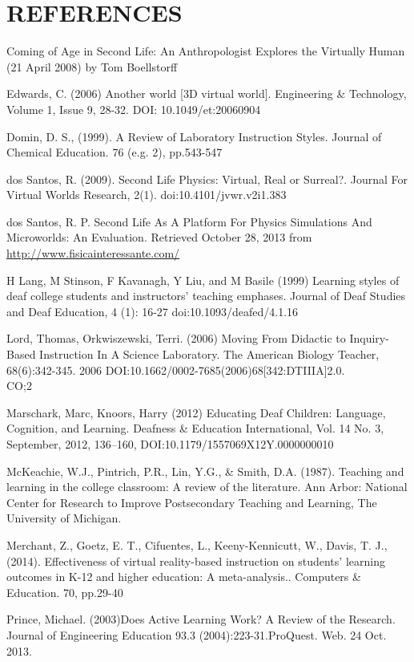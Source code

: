 \documentclass[11.5pt]{sig-alternate} %
\begin{document}
\section*{REFERENCES}\par 

\leftskip 0.25in
\parindent -0.25in 
Coming of Age in Second Life: An Anthropologist Explores the Virtually Human (21 April 2008) by Tom Boellstorff

Edwards, C. (2006) Another world [3D virtual world]. Engineering \& Technology, Volume 1, Issue 9, 28-32. DOI: 10.1049/et:20060904

Domin, D. S., (1999). A Review of Laboratory Instruction Styles. Journal of Chemical Education. 76 (e.g. 2), pp.543-547 

dos Santos, R. (2009). Second Life Physics: Virtual, Real or Surreal?. Journal For Virtual Worlds Research, 2(1). doi:10.4101/jvwr.v2i1.383 

dos Santos, R. P. Second Life As A Platform For Physics Simulations And Microworlds: An Evaluation. Retrieved October 28, 2013 from \url{http://www.fisicainteressante.com/}

H Lang, M Stinson, F Kavanagh, Y Liu, and M Basile (1999) Learning styles of deaf college students and instructors’ teaching emphases. Journal of Deaf Studies and Deaf Education, 4 (1): 16-27 doi:10.1093/deafed/4.1.16 

Lord, Thomas, Orkwiszewski, Terri. (2006) Moving From Didactic to Inquiry-Based Instruction In A Science Laboratory. The American Biology Teacher, 68(6):342-345. 2006 DOI:10.1662/0002-7685(2006)68[342:DTIIIA]2.0.\\CO;2 

Marschark, Marc, Knoors, Harry (2012) Educating Deaf Children: Language, Cognition, and Learning. Deafness \& Education International, Vol. 14 No. 3, September, 2012, 136–160, DOI:10.1179/1557069X12Y.0000000010

McKeachie, W.J., Pintrich, P.R., Lin, Y.G., \& Smith, D.A. (1987). Teaching and learning in the college classroom: A review of the literature. Ann Arbor: National Center for Research to Improve Postsecondary Teaching and Learning, The University of Michigan. 

Merchant, Z., Goetz, E. T., Cifuentes, L., Keeny-Kennicutt, W., Davis, T. J., (2014). Effectiveness of virtual reality-based instruction on students’ learning outcomes in K-12 and higher education: A meta-analysis.. Computers \& Education. 70, pp.29-40

Prince, Michael. (2003)Does Active Learning Work? A Review of the Research. Journal of Engineering Education 93.3 (2004):223-31.ProQuest. Web. 24 Oct. 2013.
\end{document}

